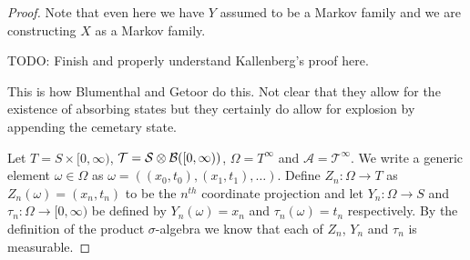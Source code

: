 \begin{proof}
Note that even here we have $Y$ assumed to be a Markov family and we
are constructing $X$ as a Markov family.

TODO: Finish and properly understand Kallenberg's proof here.

This is how Blumenthal and Getoor do this.  Not clear that they allow for the existence of absorbing states but they certainly do allow for explosion by appending
the cemetary state.

Let $T=S \times [0,\infty)$, $\mathcal{T} = \mathcal{S} \otimes
\mathcal{B}([0,\infty))$, $\Omega = T^\infty$ and $\mathcal{A} =
\mathcal{T}^\infty$.  We write a generic element $\omega \in \Omega$
as $\omega = ((x_0, t_0), (x_1, t_1), \dotsc)$.  Define $Z_n : \Omega
\to T$ as $Z_n(\omega) = (x_n, t_n)$ to be the $n^{th}$ coordinate
projection and let $Y_n : \Omega \to S$ and $\tau_n : \Omega \to
[0,\infty)$ be defined by $Y_n(\omega) = x_n$ and $\tau_n(\omega) =
t_n$ respectively.  By the definition of the product $\sigma$-algebra
we know that each of $Z_n$, $Y_n$ and $\tau_n$ is measurable.  


\end{proof}
